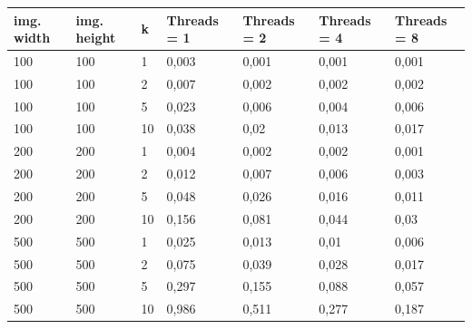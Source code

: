 \documentclass[a4paper,10pt]{article}
\begin{document}
\begin{table}[h]
\begin{tabular}{|l|l|l|l|l|l|l|}
\hline
\textbf{img. width} & \textbf{img. height} & \textbf{k} & \textbf{Threads = 1} & \textbf{Threads = 2} & \textbf{Threads = 4} & \textbf{Threads = 8} \\ \hline
100                 & 100                  & 1          & 0,003                & 0,001                & 0,001                & 0,001                \\ \hline
100                 & 100                  & 2          & 0,007                & 0,002                & 0,002                & 0,002                \\ \hline
100                 & 100                  & 5          & 0,023                & 0,006                & 0,004                & 0,006                \\ \hline
100                 & 100                  & 10         & 0,038                & 0,02                 & 0,013                & 0,017                \\ \hline
200                 & 200                  & 1          & 0,004                & 0,002                & 0,002                & 0,001                \\ \hline
200                 & 200                  & 2          & 0,012                & 0,007                & 0,006                & 0,003                \\ \hline
200                 & 200                  & 5          & 0,048                & 0,026                & 0,016                & 0,011                \\ \hline
200                 & 200                  & 10         & 0,156                & 0,081                & 0,044                & 0,03                 \\ \hline
500                 & 500                  & 1          & 0,025                & 0,013                & 0,01                 & 0,006                \\ \hline
500                 & 500                  & 2          & 0,075                & 0,039                & 0,028                & 0,017                \\ \hline
500                 & 500                  & 5          & 0,297                & 0,155                & 0,088                & 0,057                \\ \hline
500                 & 500                  & 10         & 0,986                & 0,511                & 0,277                & 0,187                \\ \hline

\end{tabular}
\end{table}
\end{document}
